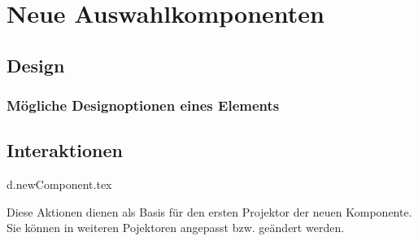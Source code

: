 \chapter{Neue Auswahlkomponenten}

\section{Design}

\subsection{Mögliche Designoptionen eines Elements}



\section{Interaktionen}

{d.newComponent.tex}

Diese Aktionen dienen als Basis für den ersten Projektor der neuen Komponente. 
Sie können in weiteren Pojektoren angepasst bzw. geändert werden.